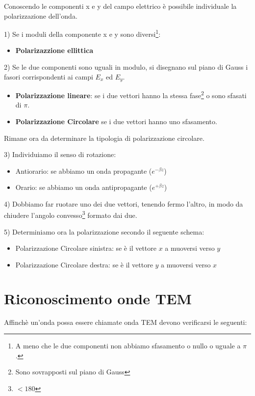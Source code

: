 \documentclass[10pt,a4paper]{report}
\begin{document}
	Conoscendo le componenti x e y del campo elettrico è possibile individuale la polarizzazione dell'onda.

	\raggedright	{1) Se i moduli della componente x e y sono diversi\footnote{A meno che le due componenti non abbiamo sfasamento o nullo o uguale a $\pi$.}:}

	\begin{itemize} 
	\item \textbf{Polarizazzione ellittica}
	\end{itemize}
	\raggedright{	2) Se le due componenti sono uguali in modulo, si disegnano sul piano di Gauss i fasori corrispondenti ai campi $E_x$ ed $E_y$.}
	\begin{itemize}
	\item \textbf{Polarizzazione lineare}: se i due vettori hanno la stessa fase\footnote{Sono sovrapposti sul piano di Gauss} o sono sfasati di $\pi$.
	\item \textbf{Polarizzazione Circolare} se i due vettori hanno uno sfasamento.
	\end{itemize}
		
	Rimane ora da determinare la tipologia di polarizzazione circolare.
	
	\raggedright{3) Individuiamo il senso di rotazione:}

	\begin{itemize}

	\item Antiorario: se abbiamo un onda propagante ($e^{-\beta z}$)
	\item Orario: se abbiamo un onda antipropagante ($e^{+\beta z}$)

	\end{itemize}
	\raggedright{4) Dobbiamo far ruotare uno dei due vettori, tenendo fermo l'altro, in modo da chiudere l'angolo convesso\footnote{$<180$} formato dai due.}

	\raggedright{	5) Determiniamo ora la polarizzazione secondo il seguente schema:}

	\begin{itemize}
	\item Polarizzazione Circolare sinistra: se è il vettore $x$ a muoversi verso $y$ 
	\item Polarizzazione Circolare destra: se è il vettore $y$ a muoversi verso $x$ 
	\end{itemize}	


	\section{Riconoscimento onde TEM}
	Affinchè un'onda possa essere chiamate onda TEM devono verificarsi le seguenti:
\end{document}

